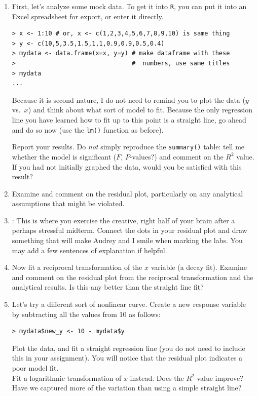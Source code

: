 \documentclass[
  letterpaper,
  DIV=11,
  numbers=noendperiod]{scrartcl}
\begin{document}
\begin{enumerate}
\def\labelenumi{\arabic{enumi}.}
\item
  First, let's analyze some mock data. To get it into \texttt{R}, you
  can put it into an Excel spreadsheet for export, or enter it directly.

\begin{verbatim}
> x <- 1:10 # or, x <- c(1,2,3,4,5,6,7,8,9,10) is same thing
> y <- c(10,5,3.5,1.5,1,1,0.9,0.9,0.5,0.4)
> mydata <- data.frame(x=x, y=y) # make dataframe with these
>                                #  numbers, use same titles
> mydata
...
\end{verbatim}

  Because it is second nature, I do not need to remind you to plot the
  data (\(y\) vs.~\(x\)) and think about what sort of model to fit.
  Because the only regression line you have learned how to fit up to
  this point is a straight line, go ahead and do so now (use the
  \texttt{lm()} function as before).

  Report your results. Do \emph{not} simply reproduce the
  \texttt{summary()} table: tell me whether the model is significant
  (\(F\), \(P\)-values?) and comment on the \(R^2\) value. If you had
  not initially graphed the data, would you be satisfied with this
  result?
\item
  Examine and comment on the residual plot, particularly on any
  analytical assumptions that might be violated.
\item
  : This is where you exercise the creative, right half of your brain
  after a perhaps stressful midterm. Connect the dots in your residual
  plot and draw something that will make Audrey and I smile when marking
  the labs. You may add a few sentences of explanation if helpful.
\item
  Now fit a reciprocal transformation of the \(x\) variable (a decay
  fit). Examine and comment on the residual plot from the reciprocal
  transformation and the analytical results. Is this any better than the
  straight line fit?
\item
  Let's try a different sort of nonlinear curve. Create a new response
  variable by subtracting all the values from 10 as follows:

\begin{verbatim}
> mydata$new_y <- 10 - mydata$y
\end{verbatim}

  Plot the data, and fit a straight regression line (you do not need to
  include this in your assignment). You will notice that the residual
  plot indicates a poor model fit.\\
  Fit a logarithmic transformation of \(x\) instead. Does the \(R^2\)
  value improve? Have we captured more of the variation than using a
  simple straight line?


\end{enumerate}
\end{document}
